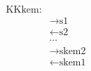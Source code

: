 \documentclass[tikz]{standalone}
\begin{document}
\label{not:KKkem}
$
\begin{array}{rl}
\text{KKkem:}\\
&\rightarrow \text{s1}\\
&\leftarrow \text{s2}\\
&\cdots\\
&\rightarrow \text{skem2}\\
&\leftarrow \text{skem1}\\
\end{array}
$
\end{document}

